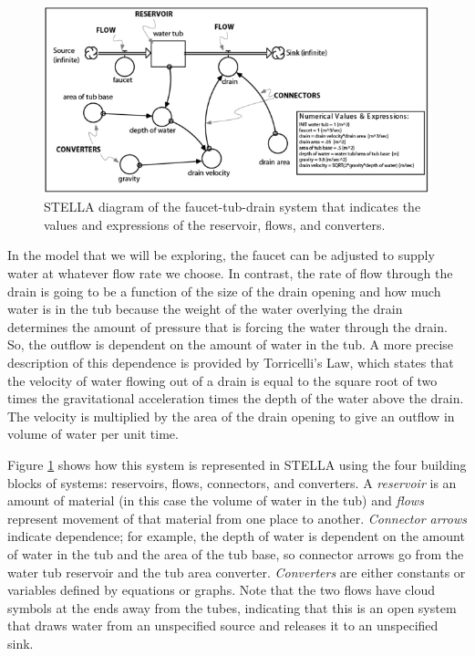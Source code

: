 \documentclass[11pt,letterpaper]{article}
\begin{document}
\begin{figure}[b!]
\begin{center}
\includegraphics[]{./stella.pdf}
\caption{STELLA diagram of the faucet-tub-drain system that indicates the values and expressions of the reservoir, flows, and converters.}
\label{fig:tub}
\end{center}
\end{figure}

In the model that we will be exploring, the faucet can be adjusted to supply water at whatever flow rate we choose. In contrast, the rate of flow through the drain is going to be a function of the size of the drain opening and how much water is in the tub because the weight of the water overlying the drain determines the amount of pressure that is forcing the water through the drain. So, the outflow is dependent on the amount of water in the tub. A more precise description of this dependence is provided by Torricelli's Law, which states that the velocity of water flowing out of a drain is equal to the square root of two times the gravitational acceleration times the depth of the water above the drain. The velocity is multiplied by the area of the drain opening to give an outflow in volume of water per unit time.

Figure \ref{fig:tub} shows how this system is represented in STELLA using the four building blocks of systems: reservoirs, flows, connectors, and converters. A \textit{reservoir} is an amount of material (in this case the volume of water in the tub) and \textit{flows} represent movement of that material from one place to another. \textit{Connector arrows} indicate dependence; for example, the depth of water is dependent on the amount of water in the tub and the area of the tub base, so connector arrows go from the water tub reservoir and the tub area converter. \textit{Converters} are either constants or variables defined by equations or graphs. Note that the two flows have cloud symbols at the ends away from the tubes, indicating that this is an open system that draws water from an unspecified source and releases it to an unspecified sink.
 
\end{document}
